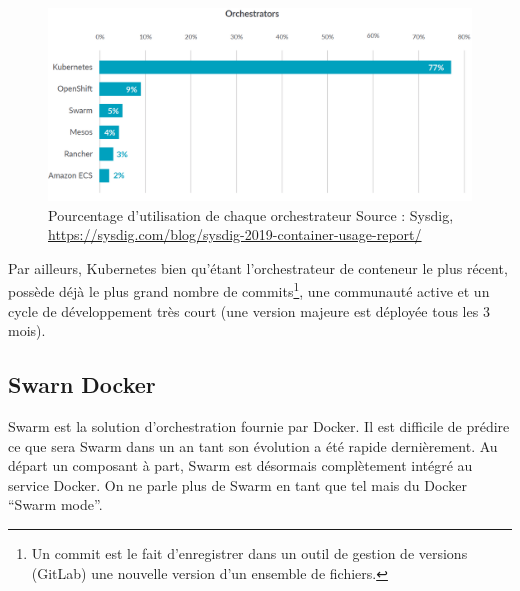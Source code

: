 \documentclass[11pt,fleqn]{book} %
\begin{document}
\begin{figure}[H]\centering
\renewcommand{\figurename}{Graphique}
\includegraphics[scale=0.3]{Pictures/orchestrators-2019.png}
\captionsetup{margin=1.5cm,format=hang,justification=justified}
\caption[]{Pourcentage d'utilisation de chaque orchestrateur\newline
Source : Sysdig, \url{https://sysdig.com/blog/sysdig-2019-container-usage-report/}}
\end{figure}

Par ailleurs, Kubernetes bien qu'étant l'orchestrateur de conteneur le plus récent, possède déjà le plus grand nombre de commits\footnote{Un commit est le fait d'enregistrer dans un outil de gestion de versions (GitLab) une nouvelle version d'un ensemble de fichiers.}, une communauté active et un cycle de développement très court (une version majeure est déployée tous les 3 mois).



\subsection{Swarn Docker}
Swarm est la solution d’orchestration fournie par Docker. Il est difficile de prédire ce que sera Swarm dans un an tant son évolution a été rapide dernièrement. Au départ un composant à part, Swarm est désormais complètement intégré au service Docker. On ne parle plus de Swarm en tant que tel mais du Docker “Swarm mode”.\\
\end{document}
